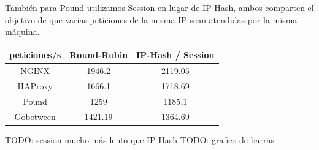 \documentclass{article}
\begin{document}
También para Pound utilizamos Session en lugar de IP-Hash,
ambos comparten el objetivo de que varias peticiones de la misma IP sean atendidas por la misma máquina.

\begin{table}[H]
	\centering
	\begin{tabular}{|c|c|c|}
		\hline
		\multicolumn{1}{|l|}{peticiones/s} & \multicolumn{1}{l|}{Round-Robin} & \multicolumn{1}{l|}{IP-Hash / Session} \\ \hline
		NGINX                              & 1946.2                           & 2119.05                                \\ \hline
		HAProxy                            & 1666.1                           & 1718.69                                \\ \hline
		Pound                              & 1259                             & 1185.1                                 \\ \hline
		Gobetween                            & 1421.19                  & 1364.69                                \\ \hline
	\end{tabular}
\end{table}

TODO: session mucho más lento que IP-Hash
TODO: grafico de barras
\end{document}
